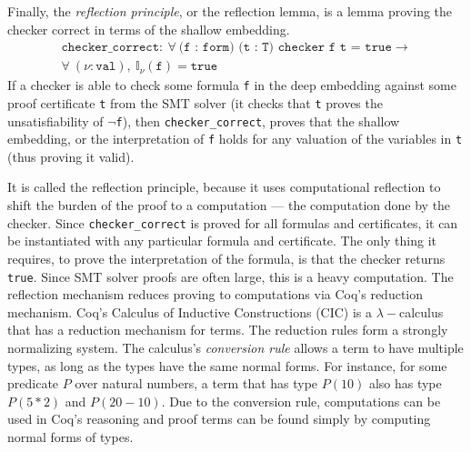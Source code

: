 \documentclass{article}
\begin{document}
	Finally, the 
	\textit{reflection principle}, 
	or the reflection lemma, is a 
	lemma proving the checker correct
	in terms of the shallow embedding.
	\begin{align*}
	\texttt{checker\_correct} :\ 
	\forall\ \texttt{(f : form)
		(t : T) checker f t = true} \to \\
	\forall\ (\nu : \texttt{val}),\ 
	\mathbb{I}_{\nu}(\texttt{f}) = 
	\texttt{true}
	\end{align*}
	If a checker is able to check 
	some formula \texttt{f} in 
	the deep embedding against
	some proof certificate \texttt{t} from 
	the SMT solver (it checks that 
	\texttt{t} proves the unsatisfiability
	of \texttt{$\neg$f}), then 
	\texttt{checker\_correct},
	proves that the shallow embedding,
	or the interpretation of \texttt{f}
	holds for any valuation of the 
	variables in \texttt{t} (thus 
	proving it valid). 
	
	It is called the reflection 
	principle, because it uses 
	computational reflection 
	to shift the burden of the 
	proof to a computation --- 
	the computation done by 
	the checker. Since 
	\texttt{checker\_correct}
	is proved for all formulas 
	and certificates, it can be 
	instantiated with any 
	particular formula and 
	certificate. The only thing it 
	requires, to 
	prove the interpretation of 
	the formula, is that the checker
	returns \texttt{true}.
	Since SMT solver proofs are 
	often large, this is a 
	heavy computation. The
	reflection mechanism reduces
	proving to computations via 
	Coq's reduction mechanism.
	Coq's Calculus of Inductive 
	Constructions (CIC) is a 
	$\lambda-$calculus that has a 
	reduction mechanism for terms. The
	reduction rules form a strongly 
	normalizing system. The calculus's
	\textit{conversion rule} allows a 
	term to have multiple types, as long as 
	the types have the same normal forms. 
	For instance, for some predicate $P$ 
	over natural numbers, a term that 
	has type $P(10)$ also has type 
	$P(5*2)$ and $P(20-10)$. Due 
	to the conversion rule, 
	computations can be used in Coq's 
	reasoning and proof terms can be 
	found simply by computing normal 
	forms of types.
	
\end{document}
